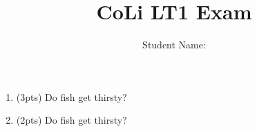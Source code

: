 \documentclass[10pt]{article}
\title{CoLi LT1 Exam}
\author{Student Name: \underline{\hspace*{12em}}}
\begin{document}
\maketitle

\hspace*{-4em}%
\begin{enumerate}[label=\bfseries Question \arabic*:]
\item (3pts) Do fish get thirsty?
\item (2pts) Do fish get thirsty?
\end{enumerate}
\end{document}
